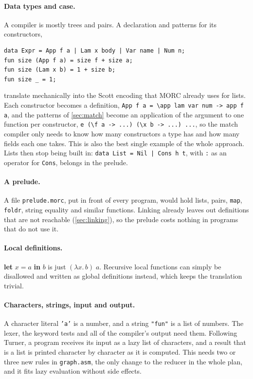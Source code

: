 \documentclass[11pt,a4paper]{article}
\theoremstyle{definition}
\theoremstyle{plain}
\newcommand{\kw}[1]{\textbf{#1}}
\begin{document}
\paragraph{Data types and \kw{case}.} A compiler is mostly trees and pairs.
A declaration and patterns for its constructors,
\begin{lstlisting}[style=morc]
data Expr = App f a | Lam x body | Var name | Num n;
fun size (App f a) = size f + size a;
fun size (Lam x b) = 1 + size b;
fun size _ = 1;
\end{lstlisting}
translate mechanically into the Scott encoding that MORC already uses for
lists. Each constructor becomes a definition,
\verb|App f a = \app lam var num -> app f a|, and the patterns of
\cref{sec:match} become an application of the argument to one function per
constructor, \verb|e (\f a -> ...) (\x b -> ...) ...|, so the match compiler
only needs to know how many constructors a type has and how many fields
each one takes. This is also the best single example of the whole
approach. Lists then stop being built in:
\verb!data List = Nil | Cons h t!, with \texttt{:} as an operator for
\texttt{Cons}, belongs in the prelude.

\paragraph{A prelude.} A file \texttt{prelude.morc}, put in front of every
program, would hold lists, pairs, \texttt{map}, \texttt{foldr}, string
equality and similar functions. Linking already leaves out definitions that
are not reachable (\cref{sec:linking}), so the prelude costs nothing in
programs that do not use it.

\paragraph{Local definitions.} \kw{let} $x = a$ \kw{in} $b$ is just
$(\lambda x.\,b)\;a$. Recursive local functions can simply be disallowed and
written as global definitions instead, which keeps the translation trivial.

\paragraph{Characters, strings, input and output.} A character literal
\texttt{'a'} is a number, and a string \texttt{"fun"} is a list of numbers.
The lexer, the keyword tests and all of the compiler's output need them.
Following Turner, a program receives its input as a lazy list of characters,
and a result that is a list is printed character by character as it is
computed. This needs two or three new rules in \texttt{graph.asm}, the only
change to the reducer in the whole plan, and it fits lazy evaluation without
side effects.
\end{document}
